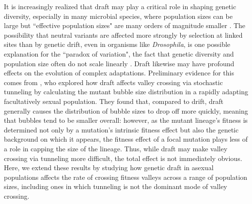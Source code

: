 \documentclass[10pt,twocolumn,twoside]{gsajnl}
\begin{document}
\begin{spacing}{1.5}
It is increasingly realized that draft may play a critical role in shaping genetic diversity, especially in many microbial species, where population sizes can be large but ``effective population sizes" are many orders of magnitude smaller \citep{masel_2011}.
The possibility that neutral variants are affected more strongly by selection at linked sites than by genetic drift, even in organisms like \emph{Drosophila}, is one possible explanation for the ``paradox of variation", the fact that genetic diversity and population size often do not scale linearly \citep{gillespie_2000, gillespie_2001, neher_kessinger_2013, corbett-detig_2015}.
Draft likewise may have profound effects on the evolution of complex adaptations.
Preliminary evidence for this comes from \citet{neher_shraiman_2011}, who explored how draft affects valley crossing via stochastic tunneling by calculating the mutant bubble size distribution in a rapidly adapting facultatively sexual population.
They found that, compared to drift, draft generally causes the distribution of bubble sizes to drop off more quickly, meaning that bubbles tend to be smaller overall: however, as the mutant lineage's fitness is determined not only by a mutation's intrinsic fitness effect but also the genetic background on which it appears, the fitness effect of a focal mutation plays less of a role in capping the size of the lineage.
Thus, while draft may make valley crossing via tunneling more difficult, the total effect is not immediately obvious.
Here, we extend these results by studying how genetic draft in asexual populations affects the rate of crossing fitness valleys across a range of population sizes, including ones in which tunneling is not the dominant mode of valley crossing.


\end{spacing}
\end{document}
